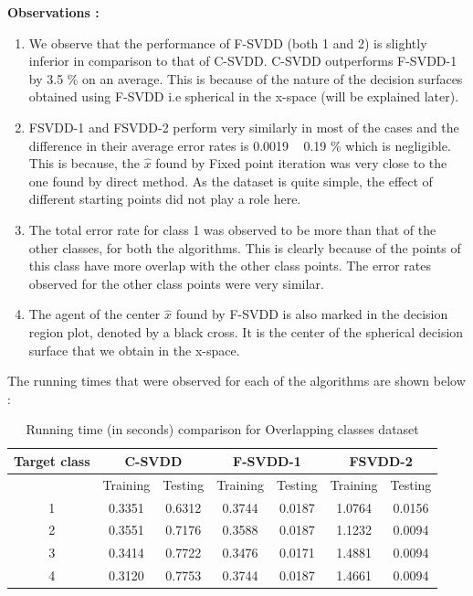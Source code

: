 \documentclass{article} %
\begin{document}
\textbf{Observations :}
\begin{enumerate}
\item We observe that the performance of F-SVDD  (both 1 and 2) is slightly inferior in comparison to that of C-SVDD. C-SVDD outperforms F-SVDD-1 by 3.5 \% on an average. This is because of the nature of the decision surfaces obtained using F-SVDD i.e  spherical in the x-space (will be explained later).

\item FSVDD-1 and FSVDD-2 perform very similarly in most of the cases and the difference in their average error rates is 0.0019 ~ 0.19 \% which is negligible. This is because, the $\hat{x}$ found by Fixed point iteration was very close to the one found by direct method. As the dataset is quite simple, the effect of different starting points did not play a role here.

\item The total error rate for class 1 was observed to be more than that of the other classes, for both the algorithms. This is clearly because of the points of this class have more overlap with the other class points. The error rates observed for the other class points were very similar.

\item The agent of the center $\hat{x}$ found by F-SVDD is also marked in the decision region plot, denoted by a black cross. It is the center of the spherical decision surface that we obtain in the x-space.

\end{enumerate}


The running times that were observed for each of the algorithms are shown below :
\begin{table}[H]
\begin{center}
\caption{Running time (in seconds) comparison for Overlapping classes dataset}
\begin{tabular}{|c|c|c|c|c|c|c|}
\hline
Target class & \multicolumn{2}{|c|}{C-SVDD} & \multicolumn{2}{|c|}{F-SVDD-1} & \multicolumn{2}{|c|}{FSVDD-2}  \\ \hline
& Training & Testing & Training & Testing & Training & Testing \\ \hline
1 & 0.3351 & 0.6312 & 0.3744  & 0.0187 & 1.0764 & 0.0156 \\ \hline
2 & 0.3551 & 0.7176 & 0.3588 & 0.0187 & 1.1232 & 0.0094 \\ \hline
3 & 0.3414 & 0.7722 & 0.3476 & 0.0171 & 1.4881 & 0.0094 \\ \hline
4 & 0.3120 & 0.7753 & 0.3744 & 0.0187 & 1.4661 &  0.0094 \\ \hline

\end{tabular} \\[5pt]
\end{center}
\end{table}
\end{document}
